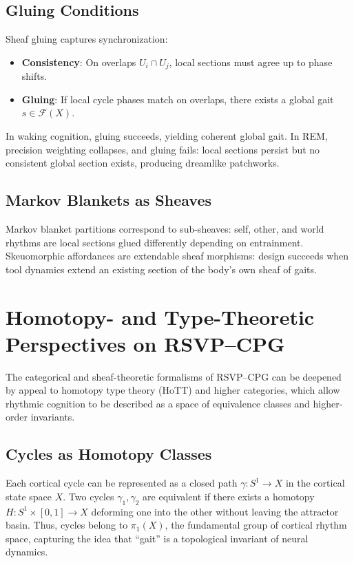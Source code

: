 \documentclass{article}
\begin{document}
\subsection{Gluing Conditions}
Sheaf gluing captures synchronization:
\begin{itemize}
  \item \textbf{Consistency}: On overlaps $U_i \cap U_j$, local sections must agree up to phase shifts.
  \item \textbf{Gluing}: If local cycle phases match on overlaps, there exists a global gait $s \in \mathcal{F}(X)$.
\end{itemize}

In waking cognition, gluing succeeds, yielding coherent global gait. In REM, precision weighting collapses, and gluing fails: local sections persist but no consistent global section exists, producing dreamlike patchworks.

\subsection{Markov Blankets as Sheaves}
Markov blanket partitions correspond to sub-sheaves: self, other, and world rhythms are local sections glued differently depending on entrainment. Skeuomorphic affordances are extendable sheaf morphisms: design succeeds when tool dynamics extend an existing section of the body’s own sheaf of gaits.

\section{Homotopy- and Type-Theoretic Perspectives on RSVP--CPG}

The categorical and sheaf-theoretic formalisms of RSVP--CPG can be deepened by appeal to homotopy type theory (HoTT) and higher categories, which allow rhythmic cognition to be described as a space of equivalence classes and higher-order invariants.

\subsection{Cycles as Homotopy Classes}
Each cortical cycle can be represented as a closed path $\gamma: S^1 \to X$ in the cortical state space $X$.  
Two cycles $\gamma_1, \gamma_2$ are equivalent if there exists a homotopy $H: S^1 \times [0,1] \to X$ deforming one into the other without leaving the attractor basin.  
Thus, cycles belong to $\pi_1(X)$, the fundamental group of cortical rhythm space, capturing the idea that “gait” is a topological invariant of neural dynamics.
\end{document}
